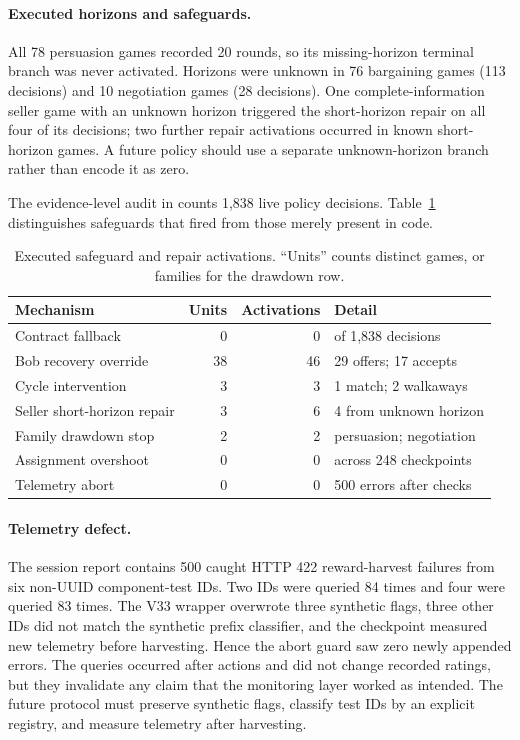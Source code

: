 \paragraph{Executed horizons and safeguards.}
All 78 persuasion games recorded 20 rounds, so its missing-horizon terminal
branch was never activated. Horizons were unknown in 76 bargaining games (113
decisions) and 10 negotiation games (28 decisions). One complete-information
seller game with an unknown horizon triggered the short-horizon repair on all
four of its decisions; two further repair activations occurred in known
short-horizon games. A future policy should use a separate unknown-horizon
branch rather than encode it as zero.

The evidence-level audit in
 counts 1,838 live policy
decisions. Table~\ref{tab:v33-activations} distinguishes safeguards that fired
from those merely present in code.
\begin{table}[t]
  \caption{Executed safeguard and repair activations. ``Units'' counts distinct
  games, or families for the drawdown row.}
  \label{tab:v33-activations}
  \centering\scriptsize
  \begin{tabular}{lrrl}
    \toprule
    Mechanism & Units & Activations & Detail \\
    \midrule
    Contract fallback & 0 & 0 & of 1,838 decisions \\
    Bob recovery override & 38 & 46 & 29 offers; 17 accepts \\
    Cycle intervention & 3 & 3 & 1 match; 2 walkaways \\
    Seller short-horizon repair & 3 & 6 & 4 from unknown horizon \\
    Family drawdown stop & 2 & 2 & persuasion; negotiation \\
    Assignment overshoot & 0 & 0 & across 248 checkpoints \\
    Telemetry abort & 0 & 0 & 500 errors after checks \\
    \bottomrule
  \end{tabular}
\end{table}

\paragraph{Telemetry defect.}
The session report contains 500 caught HTTP 422 reward-harvest failures from six
non-UUID component-test IDs. Two IDs were queried 84 times and four were queried
83 times. The V33 wrapper overwrote three synthetic flags, three other IDs did
not match the synthetic prefix classifier, and the checkpoint measured new
telemetry before harvesting. Hence the abort guard saw zero newly appended
errors. The queries occurred after actions and did not change recorded ratings,
but they invalidate any claim that the monitoring layer worked as intended.
The future protocol must preserve synthetic flags, classify test IDs by an
explicit registry, and measure telemetry after harvesting.


